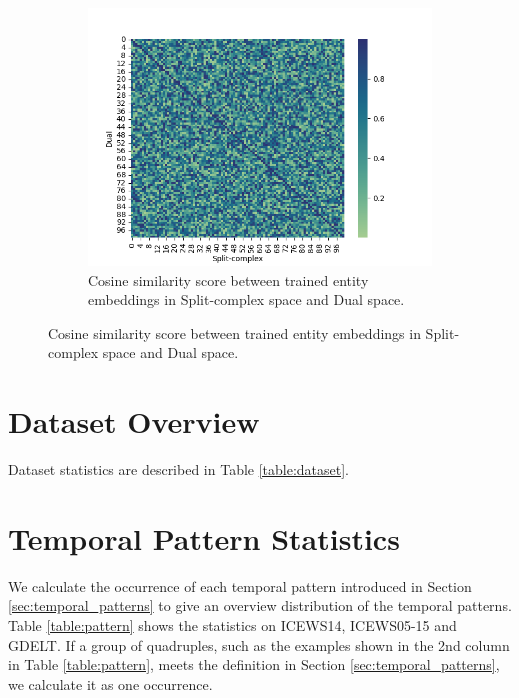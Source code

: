 \documentclass[letterpaper]{article} %
\begin{document}
\begin{figure}
\begin{subfigure}[b]{0.48\textwidth}
         \label{fig:complex_dual}
     \end{subfigure}
     \hfill
          \begin{subfigure}[b]{0.48\textwidth}
         \centering
          \includegraphics[width=\textwidth]{split_dual.png}
         \caption{Cosine similarity score between trained entity embeddings in Split-complex space and Dual space.}
         \label{fig:split_dual}
     \end{subfigure}
     \hfill

        \label{fig:cosine_similarity}
\end{figure}


\section{Dataset Overview}
\label{sec:dataset}

Dataset statistics are described in Table \ref{table:dataset}.

\section{Temporal Pattern Statistics}
We calculate the occurrence of each temporal pattern introduced in Section \ref{sec:temporal_patterns} to give an overview distribution of the temporal patterns. Table \ref{table:pattern} shows the statistics on ICEWS14, ICEWS05-15 and GDELT. If a group of quadruples, such as the examples shown in the 2nd column in Table \ref{table:pattern}, meets the definition in Section \ref{sec:temporal_patterns}, we calculate it as one occurrence.
\end{document}
